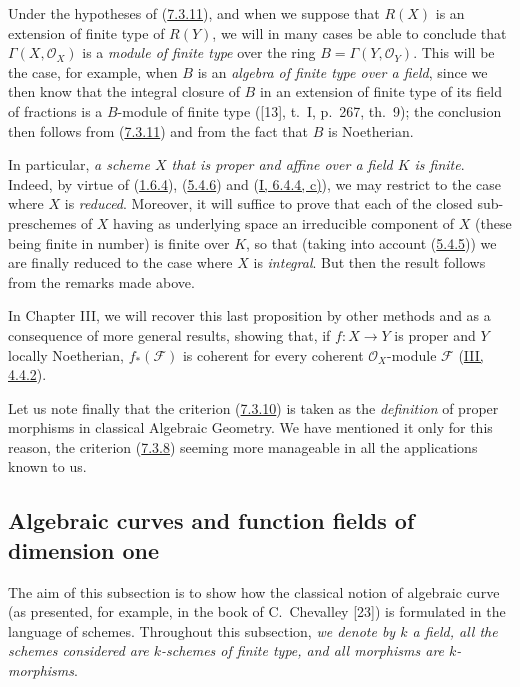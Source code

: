 \begin{remark}[7.3.12]
\label{II.7.3.12}
Under the hypotheses of (\hyperref[II.7.3.11]{7.3.11}), and when we suppose
that $R(X)$ is an extension of finite type of $R(Y)$, we will in many
cases be able to conclude that $\Gamma(X,\mathcal{O}_X)$ is a \emph{module of
finite type} over the ring $B=\Gamma(Y,\mathcal{O}_Y)$. This will be the case,
for example, when $B$ is an \emph{algebra of finite type over a field}, since
we then know that the integral closure of $B$ in an extension of finite type
of its field of fractions is a $B$-module of finite type ([13], t.~I, p.~267,
th.~9); the conclusion then follows from (\hyperref[II.7.3.11]{7.3.11}) and
from the fact that $B$ is Noetherian.

In particular, \emph{a scheme $X$ that is proper and affine over a field $K$ is
finite}. Indeed, by virtue of (\hyperref[II.1.6.4]{1.6.4}),
(\hyperref[II.5.4.6]{5.4.6}) and
(\hyperref[I.6.4.4]{I, 6.4.4, c)}), we may restrict to the case where $X$ is
\emph{reduced}. Moreover, it will suffice to prove that each of the closed
sub-preschemes of $X$ having as underlying space an irreducible component of $X$
(these being finite in number) is finite over $K$, so that (taking into
account (\hyperref[II.5.4.5]{5.4.5})) we are finally reduced to the case
where $X$ is \emph{integral}. But then the result follows from the remarks made
above.

In Chapter III, we will recover this last proposition by other
methods and as a consequence of more general results, showing that, if
$f:X\to Y$ is proper and $Y$ locally Noetherian, $f_*(\mathcal{F})$ is
coherent for every coherent $\mathcal{O}_X$-module $\mathcal{F}$
(\hyperref[III.4.4.2]{III, 4.4.2}).

Let us note finally that the criterion (\hyperref[II.7.3.10]{7.3.10}) is
taken as the \emph{definition} of proper morphisms in classical Algebraic
Geometry. We have mentioned it only for this reason, the criterion
(\hyperref[II.7.3.8]{7.3.8}) seeming more manageable in all the
applications known to us.
\end{remark}



\subsection{Algebraic curves and function fields of dimension one}
\label{subsection:II.7.4}

The aim of this subsection is to show how the classical notion of algebraic
curve (as presented, for example, in the book of C.~Chevalley [23]) is
formulated in the language of schemes. Throughout this subsection, \emph{we
denote by $k$ a field, all the schemes considered are $k$-schemes of
finite type, and all morphisms are $k$-morphisms}.


